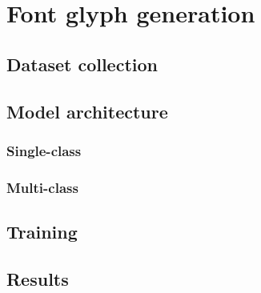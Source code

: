 \chapter{Font glyph generation}
\section{Dataset collection}\label{sec:font-data}
\section{Model architecture}
\subsection{Single-class}
\subsection{Multi-class}
\section{Training}
\section{Results}

